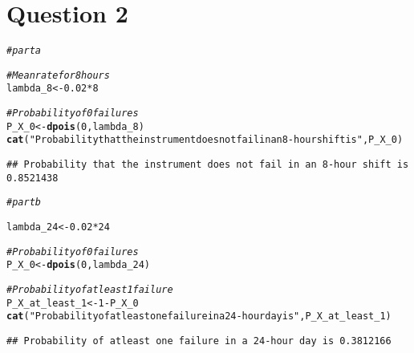\documentclass{article}\usepackage[]{graphicx}\usepackage[]{xcolor}
\makeatletter
\newcommand{\hlnum}[1]{\textcolor[rgb]{0.686,0.059,0.569}{#1}}%
\newcommand{\hlsng}[1]{\textcolor[rgb]{0.192,0.494,0.8}{#1}}%
\newcommand{\hlcom}[1]{\textcolor[rgb]{0.678,0.584,0.686}{\textit{#1}}}%
\newcommand{\hlopt}[1]{\textcolor[rgb]{0,0,0}{#1}}%
\newcommand{\hldef}[1]{\textcolor[rgb]{0.345,0.345,0.345}{#1}}%
\newcommand{\hlkwb}[1]{\textcolor[rgb]{0.69,0.353,0.396}{#1}}%
\newcommand{\hlkwd}[1]{\textcolor[rgb]{0.737,0.353,0.396}{\textbf{#1}}}%
\newenvironment{kframe}{%
 \def\at@end@of@kframe{}%
 \ifinner\ifhmode%
  \def\at@end@of@kframe{\end{minipage}}%
  \begin{minipage}{\columnwidth}%
 \fi\fi%
 \def\FrameCommand##1{\hskip\@totalleftmargin \hskip-\fboxsep
 \colorbox{shadecolor}{##1}\hskip-\fboxsep
     \hskip-\linewidth \hskip-\@totalleftmargin \hskip\columnwidth}%
 \MakeFramed {\advance\hsize-\width
   \@totalleftmargin\z@ \linewidth\hsize
   \@setminipage}}%
 {\par\unskip\endMakeFramed%
 \at@end@of@kframe}
\newenvironment{knitrout}{}{} %
\makeatother
\begin{document}
\section{Question 2}

\begin{knitrout}
\color{fgcolor}\begin{kframe}
\begin{alltt}
\hlcom{# part a}


\hlcom{# Mean rate for 8 hours}
\hldef{lambda_8} \hlkwb{<-} \hlnum{0.02} \hlopt{*} \hlnum{8}

\hlcom{# Probability of 0 failures}
\hldef{P_X_0} \hlkwb{<-} \hlkwd{dpois}\hldef{(}\hlnum{0}\hldef{, lambda_8)}
\hlkwd{cat}\hldef{(}\hlsng{"Probability that the instrument does not fail in an 8-hour shift is "}\hldef{,P_X_0)}
\end{alltt}
\begin{verbatim}
## Probability that the instrument does not fail in an 8-hour shift is  0.8521438
\end{verbatim}
\begin{alltt}
\hlcom{# part b}

\hldef{lambda_24} \hlkwb{<-} \hlnum{0.02} \hlopt{*} \hlnum{24}

\hlcom{# Probability of 0 failures}
\hldef{P_X_0} \hlkwb{<-} \hlkwd{dpois}\hldef{(}\hlnum{0}\hldef{, lambda_24)}

\hlcom{# Probability of at least 1 failure}
\hldef{P_X_at_least_1} \hlkwb{<-} \hlnum{1} \hlopt{-} \hldef{P_X_0}
\hlkwd{cat}\hldef{(}\hlsng{"Probability of atleast one failure in a 24-hour day is"}\hldef{,P_X_at_least_1)}
\end{alltt}
\begin{verbatim}
## Probability of atleast one failure in a 24-hour day is 0.3812166
\end{verbatim}
\end{kframe}
\end{knitrout}
\end{document}
